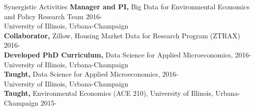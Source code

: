 \documentclass{resume} %
\begin{document}
\begin{rSection}{Synergistic Activities}
{\bf Manager and PI,} {Big Data for Environmental Economics and Policy Research Team}  \hfill { 2016-} \\
{University of Illinois, Urbana-Champaign}\\
{\bf Collaborator,} {Zillow, Housing Market Data for Research Program (ZTRAX)}  \hfill { 2016-} \\
{\bf Developed PhD Curriculum,} {Data Science for Applied Microeconomics,}  \hfill { 2016-} \\
{University of Illinois, Urbana-Champaign}\\
{\bf Taught,} {Data Science for Applied Microeconomics,}  \hfill { 2016-} \\
{University of Illinois, Urbana-Champaign}\\
{\bf Taught,} {Environmental Economics (ACE 210), University of Illinois, Urbana-Champaign}  \hfill { 2015-} \\


\end{rSection}






\end{document}
